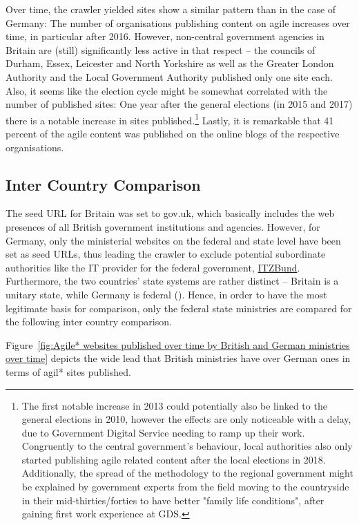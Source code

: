 Over time, the crawler yielded sites show a similar pattern than in the case of Germany: The number of organisations publishing content on agile increases over time, in particular after 2016. However, non-central government agencies in Britain are (still) significantly less active in that respect – the councils of Durham, Essex, Leicester and North Yorkshire as well as the Greater London Authority and the Local Government Authority published only one site each. Also, it seems like the election cycle might be somewhat correlated with the number of published sites: One year after the general elections (in 2015 and 2017) there is a notable increase in sites published.\footnote{The first notable increase in 2013 could potentially also be linked to the general elections in 2010, however the effects are only noticeable with a delay, due to Government Digital Service needing to ramp up their work. Congruently to the central government's behaviour, local authorities also only started publishing agile related content after the local elections in 2018. Additionally, the spread of the methodology to the regional government might be explained by government experts from the field moving to the countryside in their mid-thirties/forties to have better "family life conditions", after gaining first work experience at GDS.} Lastly, it is remarkable that 41 percent of the agile content was published on the online blogs of the respective organisations.

\subsection{Inter Country Comparison} 
The seed URL for Britain was set to gov.uk, which basically includes the web presences of all British government institutions and agencies. However, for Germany, only the ministerial websites on the federal and state level have been set as seed URLs, thus leading the crawler to exclude potential subordinate authorities like the IT provider for the federal government, \href{https://www.itzbund.de/DE/Home/home_node.html}{ITZBund}. Furthermore, the two countries' state systems are rather distinct – Britain is a unitary state, while Germany is federal (\cite{Elazar1997}). Hence, in order to have the most legitimate basis for comparison, only the federal state ministries are compared for the following inter country comparison. 

\begin{wrapfigure}[10]{r}{0.5\textwidth}
	\centering
	 \texttt{[image: \{"Analysis/3\_Data\_Analysis/visualisations/british\_vs\_German\_federal\_ministries\_over\_time"]}.pdf}
	 \caption[Agile* sites published by British and German ministries over time]{Agile* sites published by British and German ministries over time}
	 \setlength{\belowcaptionskip}{-30pt}
	 \label{fig:Agile* websites published over time by British and German ministries over time}
\end{wrapfigure}
Figure~\ref{fig:Agile* websites published over time by British and German ministries over time} depicts the wide lead that British ministries have over German ones in terms of agil* sites published. 

